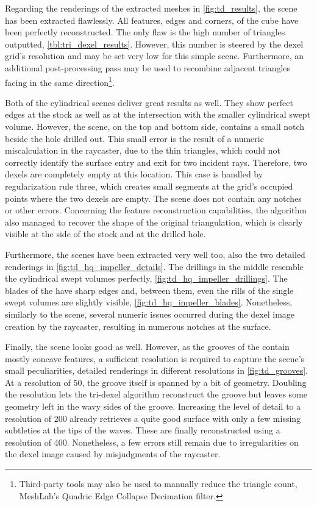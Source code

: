 Regarding the renderings of the extracted meshes in \cref{fig:td_results}, the \cubes scene has been extracted flawlessly.
All features, \ie edges and corners, of the cube have been perfectly reconstructed.
The only flaw is the high number of triangles outputted, \cf \cref{tbl:tri_dexel_results}. %
However, this number is steered by the dexel grid's resolution and may be set very low for this simple scene.
Furthermore, an additional post-processing pass may be used to recombine adjacent triangles facing in the same direction\footnote{Third-party tools may also be used to manually reduce the triangle count, \eg MeshLab's Quadric Edge Collapse Decimation filter.}.

Both of the cylindrical scenes deliver great results as well.
They show perfect edges at the stock as well as at the intersection with the smaller cylindrical swept volume.
However, the \cylinders scene, on the top and bottom side, contains a small notch beside the hole drilled out.
This small error is the result of a numeric miscalculation in the raycaster, due to the thin triangles, which could not correctly identify the surface entry and exit for two incident rays.
Therefore, two dexels are completely empty at this location.
This case is handled by regularization rule three, which creates small segments at the grid's occupied points where the two dexels are empty.
The \cylindersd scene does not contain any notches or other errors.
Concerning the feature reconstruction capabilities, the algorithm also managed to recover the shape of the original triangulation, which is clearly visible at the side of the stock and at the drilled hole.

Furthermore, the \impeller scenes have been extracted very well too, \cf also the two detailed renderings in \cref{fig:td_hq_impeller_details}.
The drillings in the middle resemble the cylindrical swept volumes perfectly, \cf \cref{fig:td_hq_impeller_drillings}.
The blades of the \impeller have sharp edges and, between them, even the rills of the single swept volumes are slightly visible, \cf \cref{fig:td_hq_impeller_blades}.
Nonetheless, similarly to the \cylinders scene, several numeric issues occurred during the dexel image creation by the raycaster, resulting in numerous notches at the surface.

Finally, the \turbine scene looks good as well.
However, as the grooves of the \turbine contain mostly concave features, a sufficient resolution is required to capture the scene's small peculiarities, \cf detailed renderings in different resolutions in \cref{fig:td_grooves}.
At a resolution of 50, the groove itself is spanned by a bit of geometry.
Doubling the resolution lets the tri-dexel algorithm reconstruct the groove but leaves some geometry left in the wavy sides of the groove.
Increasing the level of detail to a resolution of 200 already retrieves a quite good surface with only a few missing subtleties at the tips of the waves.
These are finally reconstructed using a resolution of 400.
Nonetheless, a few errors still remain due to irregularities on the dexel image caused by misjudgments of the raycaster.

